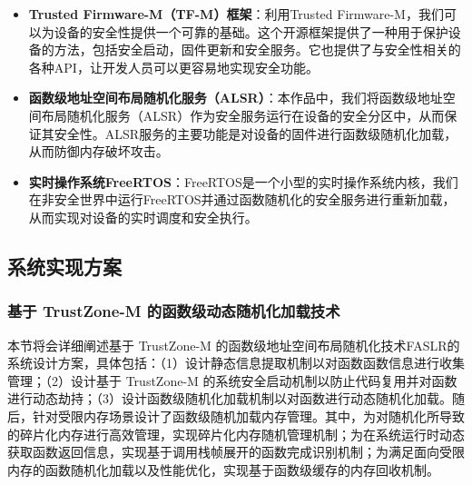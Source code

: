 \documentclass[UTF8,12pt,a4paper]{ctexart}
\numberwithin{figure}{section}
\begin{document}
\begin{itemize}
    \item \textbf{Trusted Firmware-M（TF-M）框架}：利用Trusted Firmware-M，我们可以为设备的安全性提供一个可靠的基础。这个开源框架提供了一种用于保护设备的方法，包括安全启动，固件更新和安全服务。它也提供了与安全性相关的各种API，让开发人员可以更容易地实现安全功能。
    \item \textbf{函数级地址空间布局随机化服务（ALSR）}：本作品中，我们将函数级地址空间布局随机化服务（ALSR）作为安全服务运行在设备的安全分区中，从而保证其安全性。ALSR服务的主要功能是对设备的固件进行函数级随机化加载，从而防御内存破坏攻击。
    \item \textbf{实时操作系统FreeRTOS}：FreeRTOS是一个小型的实时操作系统内核，我们在非安全世界中运行FreeRTOS并通过函数随机化的安全服务进行重新加载，从而实现对设备的实时调度和安全执行。
\end{itemize}

\subsection{系统实现方案}

\subsubsection{基于 TrustZone-M 的函数级动态随机化加载技术}
\par 本节将会详细阐述基于 TrustZone-M 的函数级地址空间布局随机化技术FASLR的系统设计方案，具体包括：（1）设计静态信息提取机制以对函数函数信息进行收集管理；（2）设计基于 TrustZone-M 的系统安全启动机制以防止代码复用并对函数进行动态劫持；（3）设计函数级随机化加载机制以对函数进行动态随机化加载。随后，针对受限内存场景设计了函数级随机加载内存管理。其中，为对随机化所导致的碎片化内存进行高效管理，实现碎片化内存随机管理机制；为在系统运行时动态获取函数返回信息，实现基于调用栈帧展开的函数完成识别机制；为满足面向受限内存的函数随机化加载以及性能优化，实现基于函数级缓存的内存回收机制。
\end{document}
